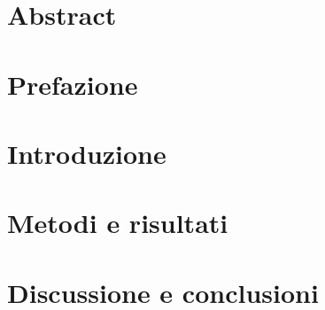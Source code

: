 \documentclass[12pt, a4paper, twoside]{report}
\begin{document}
\begin{titlepage}
    
\end{titlepage}
\setcounter{page}{1}
\tableofcontents{}
\newpage
\chapter*{Abstract}

\chapter*{Prefazione}


\chapter{Introduzione}

\chapter{Metodi e risultati}

\chapter{Discussione e conclusioni}

\end{document}
